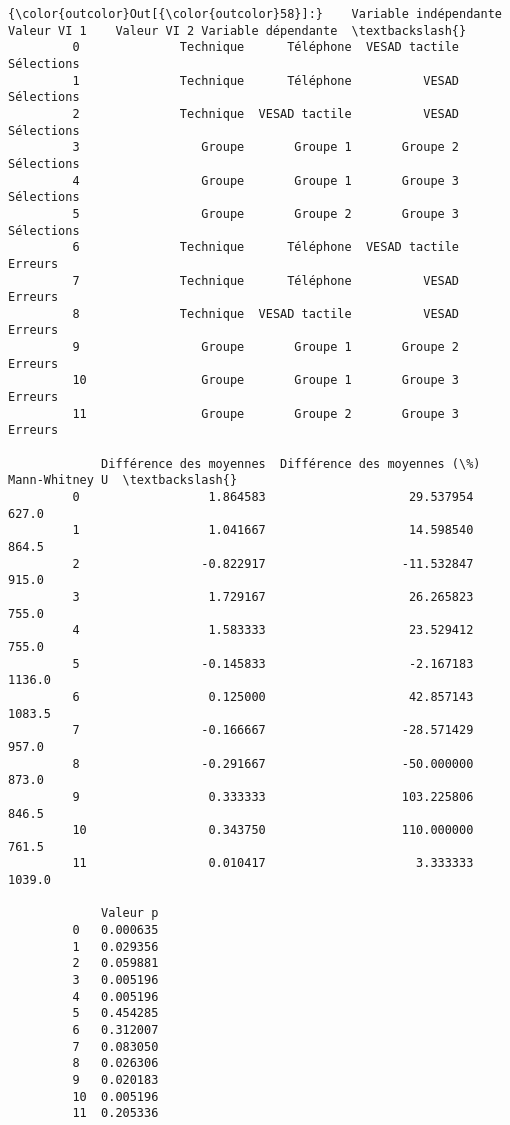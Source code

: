 \documentclass[letterpaper, 11pt]{article}
\begin{document}
\begin{Verbatim}[commandchars=\\\{\}]
{\color{outcolor}Out[{\color{outcolor}58}]:}    Variable indépendante    Valeur VI 1    Valeur VI 2 Variable dépendante  \textbackslash{}
         0              Technique      Téléphone  VESAD tactile          Sélections   
         1              Technique      Téléphone          VESAD          Sélections   
         2              Technique  VESAD tactile          VESAD          Sélections   
         3                 Groupe       Groupe 1       Groupe 2          Sélections   
         4                 Groupe       Groupe 1       Groupe 3          Sélections   
         5                 Groupe       Groupe 2       Groupe 3          Sélections   
         6              Technique      Téléphone  VESAD tactile             Erreurs   
         7              Technique      Téléphone          VESAD             Erreurs   
         8              Technique  VESAD tactile          VESAD             Erreurs   
         9                 Groupe       Groupe 1       Groupe 2             Erreurs   
         10                Groupe       Groupe 1       Groupe 3             Erreurs   
         11                Groupe       Groupe 2       Groupe 3             Erreurs   
         
             Différence des moyennes  Différence des moyennes (\%)  Mann-Whitney U  \textbackslash{}
         0                  1.864583                    29.537954           627.0   
         1                  1.041667                    14.598540           864.5   
         2                 -0.822917                   -11.532847           915.0   
         3                  1.729167                    26.265823           755.0   
         4                  1.583333                    23.529412           755.0   
         5                 -0.145833                    -2.167183          1136.0   
         6                  0.125000                    42.857143          1083.5   
         7                 -0.166667                   -28.571429           957.0   
         8                 -0.291667                   -50.000000           873.0   
         9                  0.333333                   103.225806           846.5   
         10                 0.343750                   110.000000           761.5   
         11                 0.010417                     3.333333          1039.0   
         
             Valeur p  
         0   0.000635  
         1   0.029356  
         2   0.059881  
         3   0.005196  
         4   0.005196  
         5   0.454285  
         6   0.312007  
         7   0.083050  
         8   0.026306  
         9   0.020183  
         10  0.005196  
         11  0.205336  
\end{Verbatim}
            
\end{document}
